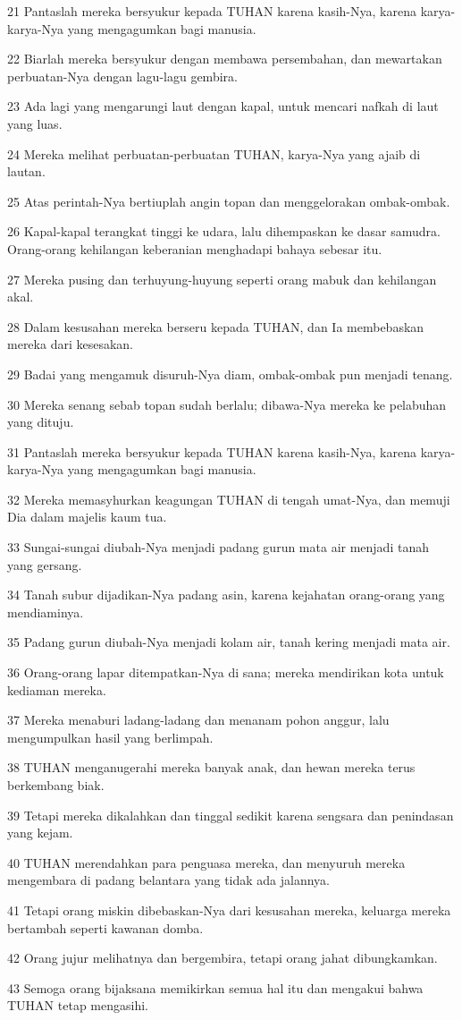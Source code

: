 \par 21 Pantaslah mereka bersyukur kepada TUHAN karena kasih-Nya, karena karya-karya-Nya yang mengagumkan bagi manusia.
\par 22 Biarlah mereka bersyukur dengan membawa persembahan, dan mewartakan perbuatan-Nya dengan lagu-lagu gembira.
\par 23 Ada lagi yang mengarungi laut dengan kapal, untuk mencari nafkah di laut yang luas.
\par 24 Mereka melihat perbuatan-perbuatan TUHAN, karya-Nya yang ajaib di lautan.
\par 25 Atas perintah-Nya bertiuplah angin topan dan menggelorakan ombak-ombak.
\par 26 Kapal-kapal terangkat tinggi ke udara, lalu dihempaskan ke dasar samudra. Orang-orang kehilangan keberanian menghadapi bahaya sebesar itu.
\par 27 Mereka pusing dan terhuyung-huyung seperti orang mabuk dan kehilangan akal.
\par 28 Dalam kesusahan mereka berseru kepada TUHAN, dan Ia membebaskan mereka dari kesesakan.
\par 29 Badai yang mengamuk disuruh-Nya diam, ombak-ombak pun menjadi tenang.
\par 30 Mereka senang sebab topan sudah berlalu; dibawa-Nya mereka ke pelabuhan yang dituju.
\par 31 Pantaslah mereka bersyukur kepada TUHAN karena kasih-Nya, karena karya-karya-Nya yang mengagumkan bagi manusia.
\par 32 Mereka memasyhurkan keagungan TUHAN di tengah umat-Nya, dan memuji Dia dalam majelis kaum tua.
\par 33 Sungai-sungai diubah-Nya menjadi padang gurun mata air menjadi tanah yang gersang.
\par 34 Tanah subur dijadikan-Nya padang asin, karena kejahatan orang-orang yang mendiaminya.
\par 35 Padang gurun diubah-Nya menjadi kolam air, tanah kering menjadi mata air.
\par 36 Orang-orang lapar ditempatkan-Nya di sana; mereka mendirikan kota untuk kediaman mereka.
\par 37 Mereka menaburi ladang-ladang dan menanam pohon anggur, lalu mengumpulkan hasil yang berlimpah.
\par 38 TUHAN menganugerahi mereka banyak anak, dan hewan mereka terus berkembang biak.
\par 39 Tetapi mereka dikalahkan dan tinggal sedikit karena sengsara dan penindasan yang kejam.
\par 40 TUHAN merendahkan para penguasa mereka, dan menyuruh mereka mengembara di padang belantara yang tidak ada jalannya.
\par 41 Tetapi orang miskin dibebaskan-Nya dari kesusahan mereka, keluarga mereka bertambah seperti kawanan domba.
\par 42 Orang jujur melihatnya dan bergembira, tetapi orang jahat dibungkamkan.
\par 43 Semoga orang bijaksana memikirkan semua hal itu dan mengakui bahwa TUHAN tetap mengasihi.

